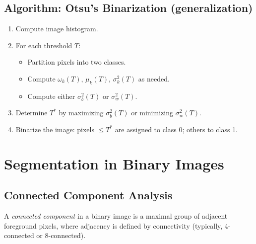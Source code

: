 \subsection{Algorithm: Otsu’s Binarization (generalization)}

\begin{enumerate}
    \item Compute image histogram.
    \item For each threshold $T$:
    \begin{itemize}
        \item Partition pixels into two classes.
        \item Compute $\omega_k(T)$, $\mu_k(T)$, $\sigma_k^2(T)$ as needed.
        \item Compute either $\sigma_b^2(T)$ or $\sigma_w^2(T)$.
    \end{itemize}
    \item Determine $T^*$ by maximizing $\sigma_b^2(T)$ or minimizing $\sigma_w^2(T)$.
    \item Binarize the image: pixels $\leq T^*$ are assigned to class 0; others to class 1.
\end{enumerate}



\section{Segmentation in Binary Images}
\subsection{Connected Component Analysis}
A \emph{connected component} in a binary image is a maximal group of adjacent foreground pixels, where adjacency is defined by connectivity (typically, 4-connected or 8-connected).

